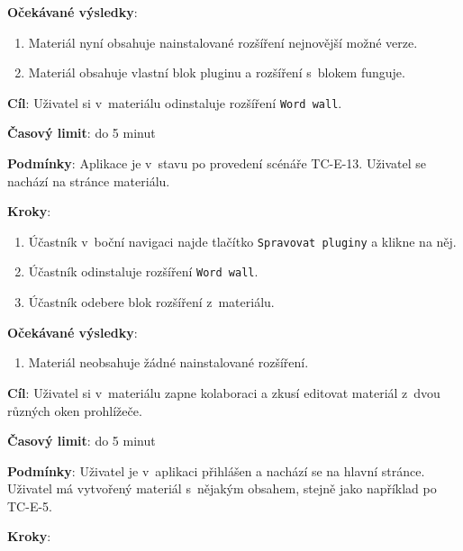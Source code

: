 \textbf{Očekávané výsledky}:

\begin{enumerate}[leftmargin=1.4cm]
    \item Materiál nyní obsahuje nainstalované rozšíření nejnovější možné verze.
    \item Materiál obsahuje vlastní blok pluginu a rozšíření s~blokem funguje.
\end{enumerate}



\vspace{1em}

\textbf{Cíl}: Uživatel si v~materiálu odinstaluje rozšíření \verb|Word wall|.

\textbf{Časový limit}: do 5 minut

\textbf{Podmínky}:  Aplikace je v~stavu po provedení scénáře TC-E-13. Uživatel se nachází na stránce materiálu.

\textbf{Kroky}:

\begin{enumerate}[leftmargin=1.4cm]
    \item Účastník v~boční navigaci najde tlačítko \verb|Spravovat pluginy| a klikne na něj.
    \item Účastník odinstaluje rozšíření \verb|Word wall|.
    \item Účastník odebere blok rozšíření z~materiálu.
\end{enumerate}

\textbf{Očekávané výsledky}:

\begin{enumerate}[leftmargin=1.4cm]
    \item Materiál neobsahuje žádné nainstalované rozšíření.
\end{enumerate}




\vspace{1em}

\textbf{Cíl}: Uživatel si v~materiálu zapne kolaboraci a zkusí editovat materiál z~dvou různých oken prohlížeče. 

\textbf{Časový limit}: do 5 minut

\textbf{Podmínky}:  Uživatel je v~aplikaci přihlášen a nachází se na hlavní stránce.  Uživatel má vytvořený materiál s~nějakým obsahem, stejně jako například po TC-E-5.

\textbf{Kroky}:

